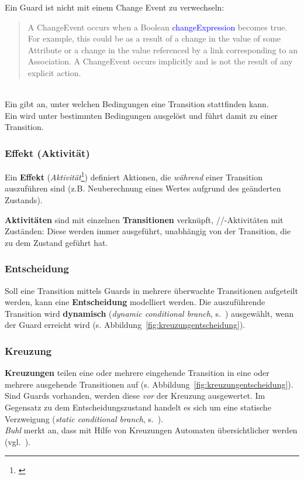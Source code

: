 \begin{tcolorbox}
    Ein Guard ist nicht mit einem Change Event zu verwechseln:\\

    \blockquote[{\cite[292]{OMG17}}]{
        A ChangeEvent occurs when a Boolean \textcolor{blue}{changeExpression} becomes true. For example, this could be as a result of a
        change in the value of some Attribute or a change in the value referenced by a link corresponding to an Association. A
        ChangeEvent occurs implicitly and is not the result of any explicit action.
    }\\

    \noindent
    Ein  gibt an, unter welchen Bedingungen eine Transition stattfinden kann.\\
    Ein  wird unter bestimmten Bedingungen ausgelöst und führt damit zu einer Transition.
\end{tcolorbox}

\subsubsection*{Effekt (Aktivität)}
Ein \textbf{Effekt} (\textit{Aktivität}\footnote{\cite[88]{Bal05}}) definiert Aktionen, die \textit{während} einer Transition auszuführen sind (z.B. Neuberechnung eines Wertes aufgrund des geänderten Zustands).\\

\begin{tcolorbox}
    \textbf{Aktivitäten} sind mit einzelnen \textbf{Transitionen} verknüpft, //-Aktivitäten mit Zuständen: Diese werden immer ausgeführt, unabhängig von der Transition, die zu dem Zustand geführt hat.
\end{tcolorbox}

\subsubsection*{Entscheidung}
Soll eine Transition mittels Guards in mehrere überwachte Transitionen aufgeteilt werden, kann eine \textbf{Entscheidung} modelliert werden.
Die auszuführende Transition wird \textbf{dynamisch} (\textit{dynamic conditional branch}, s.~\cite[339 f.]{Bal05}) ausgewählt, wenn der Guard erreicht wird (s. Abbildung~\ref{fig:kreuzungentscheidung}).


\subsubsection*{Kreuzung}
\textbf{Kreuzungen} teilen eine oder mehrere eingehende Transition in eine oder mehrere ausgehende Transitionen auf (s. Abbildung~\ref{fig:kreuzungentscheidung}).\\
Sind Guards vorhanden, werden diese \textit{vor} der Kreuzung ausgewertet.
Im Gegensatz zu dem Entscheidungszustand handelt es sich um eine statische Verzweigung (\textit{static conditional branch}, s.~\cite[340]{Bal05}).\\
\textit{Buhl} merkt an, dass mit Hilfe von Kreuzungen Automaten übersichtlicher werden (vgl.~\cite[73]{Buh09}).

